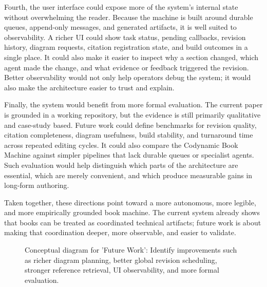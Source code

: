 \documentclass[11pt]{article}
\begin{document}
Fourth, the user interface could expose more of the system's internal state without overwhelming the reader. Because the machine is built around durable queues, append-only messages, and generated artifacts, it is well suited to observability. A richer UI could show task status, pending callbacks, revision history, diagram requests, citation registration state, and build outcomes in a single place. It could also make it easier to inspect why a section changed, which agent made the change, and what evidence or feedback triggered the revision. Better observability would not only help operators debug the system; it would also make the architecture easier to trust and explain.

Finally, the system would benefit from more formal evaluation. The current paper is grounded in a working repository, but the evidence is still primarily qualitative and case-study based. Future work could define benchmarks for revision quality, citation completeness, diagram usefulness, build stability, and turnaround time across repeated editing cycles. It could also compare the Codynamic Book Machine against simpler pipelines that lack durable queues or specialist agents. Such evaluation would help distinguish which parts of the architecture are essential, which are merely convenient, and which produce measurable gains in long-form authoring.

Taken together, these directions point toward a more autonomous, more legible, and more empirically grounded book machine. The current system already shows that books can be treated as coordinated technical artifacts; future work is about making that coordination deeper, more observable, and easier to validate.

\begin{figure}[htbp]
\centering

\caption{Conceptual diagram for 'Future Work': Identify improvements such as richer diagram planning, better global revision scheduling, stronger reference retrieval, UI observability, and more formal evaluation.}
\end{figure}
\end{document}
